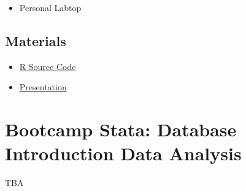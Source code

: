 \documentclass[
]{book}
\providecommand{\tightlist}{%
  \setlength{\itemsep}{0pt}\setlength{\parskip}{0pt}}
\begin{document}
\begin{itemize}
\tightlist
\item
  Personal Labtop
\end{itemize}

\hypertarget{materials}{%
\section{Materials}\label{materials}}

\begin{itemize}
\tightlist
\item
  \href{https://github.com/chadchae/ws_ba_bootcamp_2021/blob/master/products/snabootcamp.R}{R Source Code}
\item
  \href{https://github.com/chadchae/ws_ba_bootcamp_2021/blob/master/products/snabootcamp.pdf}{Presentation}
\end{itemize}

\hypertarget{bootcamp-stata-database-introduction-data-analysis}{%
\chapter{Bootcamp Stata: Database Introduction Data Analysis}\label{bootcamp-stata-database-introduction-data-analysis}}

TBA
\end{document}
